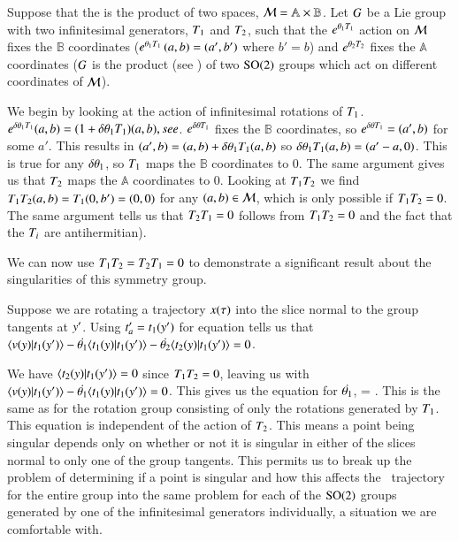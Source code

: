 Suppose that the {\statesp} is the product of two spaces,
${\cal M}=\mathbb{A} \times \mathbb{B}$. Let $G$ be a Lie group
with two infinitesimal generators, $T_1$ and $T_2$, such that the
$e^{{\bf \theta}_1 T_1}$ action on ${\cal M}$ fixes the $\mathbb{B}$
coordinates ($e^{{\bf \theta}_1 T_1} \, (a,b)=(a',b')$ where $b'=b$) and
$e^{{\bf \theta}_2 T_2}$ fixes the $\mathbb{A}$ coordinates ($G$ is the
product (see ) of two $\textrm{SO}(2)$ groups which act on
different coordinates of ${\cal M}$).

We begin by looking at the action of infinitesimal rotations of $T_1$.
$e^{\delta {\bf \theta}_1 T_1}(a,b)=(1+\delta {\bf \theta}_1 T_1)
(a,b), see $. $e^{\delta {\bf \theta} T_1}$ fixes the
$\mathbb{B}$ coordinates, so $e^{\delta {\bf \theta} T_1}=(a',b)$ for some
$a'$. This results in $(a',b)=(a,b)+\delta {\bf \theta}_1 T_1(a,b)$ so
$\delta {\bf \theta}_1 T_1(a,b)=(a'-a,0)$. This is true for any $\delta
{\bf \theta}_1$, so $T_1$ maps the $\mathbb{B}$ coordinates to 0. The same
argument gives us that $T_2$ maps the $\mathbb{A}$ coordinates to 0.
Looking at $T_1 T_2$ we find $T_1 T_2 (a,b)=T_1 (0,b')=(0,0)$
for any $(a,b) \in {\cal M}$, which is only possible if $T_1
T_2=0$. The same argument tells us that $T_2 T_1=0$ %
follows from $T_1 T_2=0$ and the fact that the $T_i$ are
antihermitian).

We can now use $T_1 T_2=T_2 T_1=0$ to demonstrate a significant
result about the singularities of this symmetry group.

Suppose we are rotating a trajectory $x(\tau)$ into the slice normal
to the group tangents at ${y'}$. Using
$t'_{a}=t_1({y'})$ for equation
 tells us that
$\braket{\vel(\sspRed)}{\groupTan_1(\slicep)}-\dot{\gSpace_1} \braket{
\groupTan_1(\sspRed)}{\groupTan_1(\slicep)}-\dot{\gSpace_2} \braket{
\groupTan_2(\sspRed)}{\groupTan_1(\slicep)}=0$.

We have $\braket{\groupTan_2(\sspRed)}{\groupTan_1(\slicep)}=0$ since
$T_1 T_2=0$, leaving us with
$\braket{\vel(\sspRed)}{\groupTan_1(\slicep)}
-\dot{\gSpace_1}\braket{\groupTan_1(\sspRed)}{\groupTan_1(\slicep)}=0$.
This gives us the equation for $\dot{{\bf \theta}_1}$,
\beq
{}=
                     {}.
\eeq
This is the same as  for the rotation group
consisting of only the rotations generated by $T_1$. This equation is
independent of the action of $T_2$. This means a point being singular
depends only on whether or not it is singular in either of the slices
normal to only one of the group tangents. This permits us to break up the
problem of determining if a point is singular and how this affects the
\reducedsp\ trajectory for the entire group into the same problem for
each of the $\textrm{SO}(2)$ groups generated by one of the infinitesimal
generators individually, a situation we are comfortable with.

